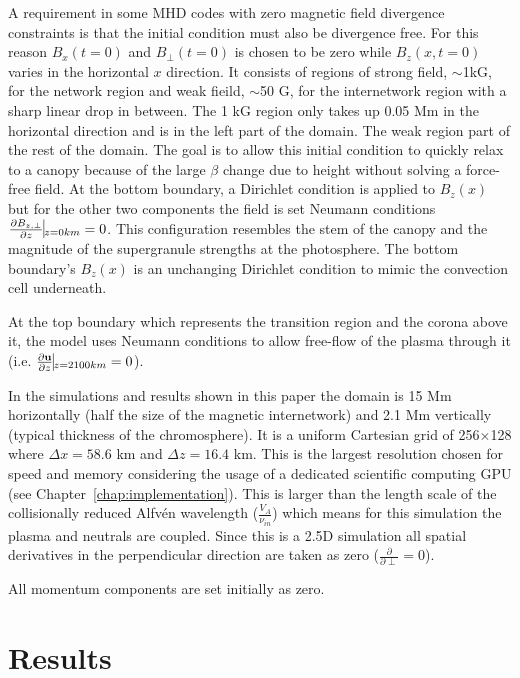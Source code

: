 \documentclass[12pt,upcase]{umlthesis}
\begin{document}
A requirement in some MHD codes with zero magnetic field divergence constraints is that the initial condition must also be divergence free. For this reason $B_x(t=0)$ and $B_\perp(t=0)$ is chosen to be zero while $B_z(x, t=0)$ varies in the horizontal $x$ direction. It consists of regions of strong field, $\sim$1kG, for the network region and weak fieild, $\sim$50 G, for the internetwork region with a sharp linear drop in between. The 1 kG region only takes up 0.05 Mm in the horizontal direction and is in the left part of the domain. The weak region part of the rest of the domain. The goal is to allow this initial condition to quickly relax to a canopy because of the large $\beta$ change due to height without solving a force-free field. At the bottom boundary,  a Dirichlet condition is applied to $B_z(x)$ but for the other two components the field is set Neumann conditions $\frac{\partial B_{z,\perp}}{\partial z}\vline_{z=0km} = 0$. This configuration resembles the stem of the canopy and the magnitude of the supergranule strengths at the photosphere. The bottom boundary's $B_z(x)$ is an unchanging Dirichlet condition to mimic the convection cell underneath.

At the top boundary which represents the transition region and the corona above it, the model uses Neumann conditions to allow free-flow of the plasma through it (i.e. $\frac{\partial \textbf{u}}{\partial z}\vline_{z=2100km} = 0$).

In the simulations and results shown in this paper the domain is 15 Mm horizontally (half the size of the magnetic internetwork) and 2.1 Mm vertically (typical thickness of the chromosphere). It is a uniform Cartesian grid of 256$\times$128 where $\Delta x = 58.6$ km and $\Delta z = 16.4$ km. This is the largest resolution chosen for speed and memory considering the usage of a dedicated scientific computing GPU (see Chapter~\ref{chap:implementation}). This is larger than the length scale of the collisionally reduced Alfv\'en wavelength ($\frac{V_A}{\nu_{in}}$) which means for this simulation the plasma and neutrals are coupled. Since this is a 2.5D simulation all spatial derivatives in the perpendicular direction are taken as zero ($\frac{\partial}{\partial \perp} = 0$).

All momentum components are set initially as zero.

\section{Results}\label{sec:results}
\end{document}
